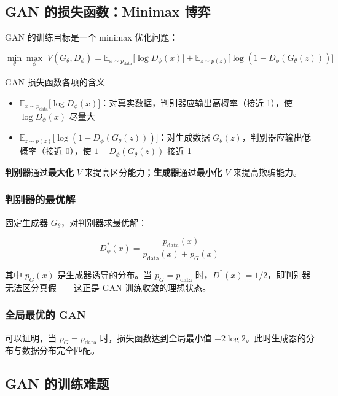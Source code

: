 \documentclass[a4paper]{article}
\begin{document}
\subsection{GAN 的损失函数：Minimax 博弈}

GAN 的训练目标是一个 minimax 优化问题：

$$\min_\theta \max_\phi \; V(G_\theta, D_\phi) = \mathbb{E}_{x \sim p_{\text{data}}} {[}\log D_\phi(x){]} + \mathbb{E}_{z \sim p(z)} {[}\log(1 - D_\phi(G_\theta(z))){]}$$

\begin{importantbox}{GAN 损失函数各项的含义}
\begin{itemize}
    \item $\mathbb{E}_{x \sim p_{\text{data}}} {[}\log D_\phi(x){]}$：对真实数据，判别器应输出高概率（接近 1），使 $\log D_\phi(x)$ 尽量大
    \item $\mathbb{E}_{z \sim p(z)} {[}\log(1 - D_\phi(G_\theta(z))){]}$：对生成数据 $G_\theta(z)$，判别器应输出低概率（接近 0），使 $1 - D_\phi(G_\theta(z))$ 接近 1
\end{itemize}
\textbf{判别器}通过\textbf{最大化} $V$ 来提高区分能力；\textbf{生成器}通过\textbf{最小化} $V$ 来提高欺骗能力。
\end{importantbox}

\subsubsection{判别器的最优解}

固定生成器 $G_\theta$，对判别器求最优解：

$$D^*_\phi(x) = \frac{p_{\text{data}}(x)}{p_{\text{data}}(x) + p_G(x)}$$

其中 $p_G(x)$ 是生成器诱导的分布。当 $p_G = p_{\text{data}}$ 时，$D^*(x) = 1/2$，即判别器无法区分真假——这正是 GAN 训练收敛的理想状态。

\subsubsection{全局最优的 GAN}

可以证明，当 $p_G = p_{\text{data}}$ 时，损失函数达到全局最小值 $-2\log 2$。此时生成器的分布与数据分布完全匹配。

\subsection{GAN 的训练难题}
\end{document}
